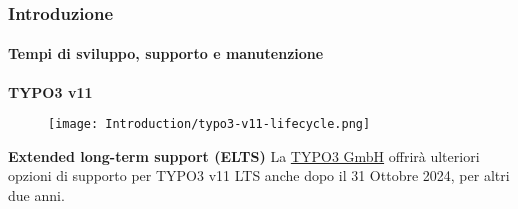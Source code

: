 %

\begin{frame}[fragile]
	\frametitle{Introduzione}
	\framesubtitle{Tempi di sviluppo, supporto e manutenzione}

	\textbf{TYPO3 v11}

	\begin{figure}
		\texttt{[image: Introduction/typo3-v11-lifecycle.png]}
	\end{figure}

	\textbf{Extended long-term support (ELTS)}\newline
	\smaller
        La \href{https://typo3.com}{TYPO3 GmbH} offrirà ulteriori opzioni di supporto
        per TYPO3 v11 LTS anche dopo il 31 Ottobre 2024, per altri due anni.
	\normalsize

\end{frame}


